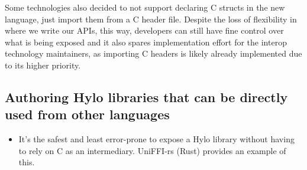 Some technologies also decided to not support declaring C structs in the new language, just import them from a C header file. Despite the loss of flexibility in where we write our APIs, this way, developers can still have fine control over what is being exposed and it also spares implementation effort for the interop technology maintainers, as importing C headers is likely already implemented due to its higher priority.


\subsection{Authoring Hylo libraries that can be directly used from other languages}
\begin{itemize}
\item It's the safest and least error-prone to expose a Hylo library without having to rely on C as an intermediary. UniFFI-rs (Rust) provides an example of this.
\end{itemize}
